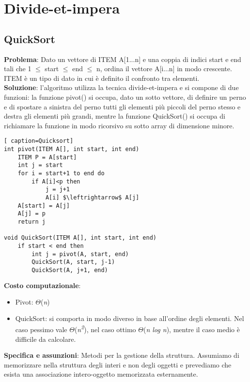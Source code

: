 \documentclass[../cheatSheetAlgoritmi.tex]{subfiles}
\begin{document}
\section{Divide-et-impera}
\subsection{QuickSort}
\label{sec:quicksort}
\textbf{Problema}: Dato un vettore di ITEM A[1...n] e una coppia di indici start e end tali che 1  $\leq$ start  $\leq$ end  $\leq$ n, ordina il vettore A[i...n] in modo crescente. ITEM è un tipo di dato in cui è definito il confronto tra elementi.\\
\textbf{Soluzione}: l'algoritmo utilizza la tecnica divide-et-impera e si compone di due funzioni: la funzione pivot() si occupa, dato un sotto vettore, di definire un perno e di spostare a sinistra del perno tutti gli elementi più piccoli del perno stesso e  destra  gli elementi più grandi, mentre la funzione QuickSort() si occupa di richiamare la funzione in modo ricorsivo su sotto array di dimensione minore.\
\begin{lstlisting}[ caption=Quicksort]
int pivot(ITEM A[], int start, int end)
	ITEM P = A[start]
	int j = start
	for i = start+1 to end do
		if A[i]<p then 
			j = j+1
			A[i] $\leftrightarrow$ A[j]
	A[start] = A[j]
	A[j] = p	
	return j

void QuickSort(ITEM A[], int start, int end)
	if start < end then
		int j = pivot(A, start, end)
		QuickSort(A, start, j-1)
		QuickSort(A, j+1, end)		
\end{lstlisting}
\textbf{Costo computazionale}:
\begin{itemize}
 	\item Pivot: $\Theta$(\textit{n}) 
 	\item QuickSort: si comporta in modo diverso in base all'ordine degli elementi. Nel caso pessimo vale $\Theta$(\textit{n\textsuperscript{2}}), nel caso ottimo  $\Theta$(\textit{n log n}), mentre il caso medio è difficile da calcolare. 
\end{itemize}
\textbf{Specifica e assunzioni}: Metodi per la gestione della struttura. Assumiamo di memorizzare nella struttura degli interi e non degli oggetti e prevediamo che esista una associazione intero-oggetto memorizzata esternamente.\
\end{document}

